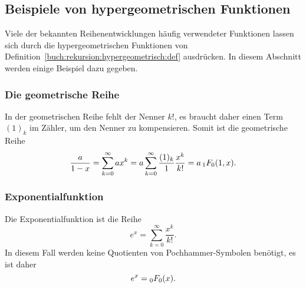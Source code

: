 \subsection{Beispiele von hypergeometrischen Funktionen
\label{buch:rekursion:hypergeometrisch:beispiele}}
Viele der bekannten Reihenentwicklungen häufig verwendeter Funktionen
lassen sich durch die hypergeometrischen Funktionen von
Definition~\ref{buch:rekursion:hypergeometrisch:def} ausdrücken.
In diesem Abschnitt werden einige Beispiel dazu gegeben.

\subsubsection{Die geometrische Reihe}
In der geometrischen Reihe fehlt der Nenner $k!$, es braucht
daher einen Term $(1)_k$ im Zähler, um den Nenner zu kompensieren.
Somit ist die geometrische Reihe
\[
\frac{a}{1-x}
=
\sum_{k=0}^\infty
ax^k
=
a\sum_{k=0}^\infty
\frac{(1)_k}{1}
\frac{x^k}{k!}
=
a\,\mathstrut_1F_0(1,x).
\]

\subsubsection{Exponentialfunktion}
Die Exponentialfunktion ist die Reihe
\[
e^x = \sum_{k=0}^\infty \frac{x^k}{k!}.
\]
In diesem Fall werden keine Quotienten von Pochhammer-Symbolen
benötigt, es ist daher
\[
e^x = \mathstrut_0F_0(x).
\]


